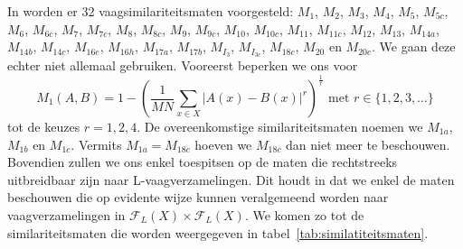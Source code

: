 In \cite{vanderweken:similariteitsmaten} worden er 32 vaagsimilariteitsmaten voorgesteld: $M_1$, $M_2$,
$M_3$, $M_4$, $M_5$, $M_{5c}$, $M_6$, $M_{6c}$, $M_7$, $M_{7c}$, $M_8$, $M_{8c}$, $M_9$, $M_{9c}$,
$M_{10}$, $M_{10c}$, $M_{11}$, $M_{11c}$, $M_{12}$, $M_{13}$, $M_{14a}$, $M_{14b}$, $M_{14c}$, 
$M_{16e}$, $M_{16h}$, $M_{17a}$, $M_{17b}$, $M_{I_3}$, $M_{I_{3c}}$, $M_{18c}$, $M_{20}$ en $M_{20c}$.
We gaan deze echter niet allemaal gebruiken. Vooreerst beperken we ons voor
$$
M_1(A,B) = 1 - \left(\frac{1}{M N} \sum_{x \in X} | A(x) - B(x)|^r\right)^\frac{1}{r} \textrm{ met } 
r \in \{1,2,3,\ldots\}
$$ tot de keuzes
$r=1,2,4$. De overeenkomstige similariteitsmaten noemen we $M_{1a}$, $M_{1b}$ en $M_{1c}$. Vermits
$M_{1a}=M_{18c}$ hoeven we $M_{18c}$ dan niet meer te beschouwen. Bovendien zullen we ons enkel
toespitsen op de maten die rechtstreeks uitbreidbaar zijn naar L-vaagverzamelingen. Dit houdt in
dat we enkel de maten beschouwen die op evidente wijze kunnen veralgemeend worden naar 
vaagverzamelingen in $\mathcal{F}_L(X) \times \mathcal{F}_L(X)$. We komen zo tot
de similariteitsmaten die worden weergegeven in tabel~\ref{tab:similatiteitsmaten}. 


